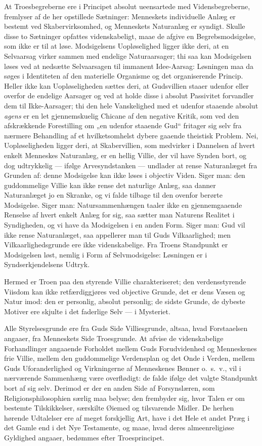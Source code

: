 \documentclass[12pt]{book}
\begin{document}
At Troesbegreberne ere i Principet absolut ueensartede med
Vidensbegreberne, fremlyser af de her opstillede Sætninger:
Menneskets individuelle Anlæg er bestemt ved Skabervirksomhed, og
Menneskets Naturanlæg er syndigt. Skulle disse to Sætninger opfattes
videnskabeligt, maae de afgive en Begrebsmodsigelse, som ikke er til
at løse. Modsigelsens Uopløselighed ligger ikke deri, at en
Selvaarsag virker sammen med endelige Naturaarsager; thi saa kan
Modsigelsen løses ved at nedsætte Selvaarsagen til immanent
Idee-Aarsag: Løsningen maa da søges i Identiteten af den materielle
Organisme og det organiserende Princip. Heller ikke kan
Uopløseligheden sættes deri, at Gudsvillien staaer udenfor eller
overfor de endelige Aarsager og ved at holde disse i absolut
Passivitet forvandler dem til Ikke-Aarsager; thi den hele
Vanskelighed med et udenfor staaende absolut \textit{agens} er en
let gjennemskuelig Chicane af den negative Kritik, som ved den
afskrækkende Forestilling om „en udenfor staaende Gud“ fritager sig
selv fra nærmere Behandling af et hvilketsomhelst dybere gaaende
theistisk Problem. Nei, Uopløseligheden ligger deri, at
Skabervillien, som medvirker i Dannelsen af hvert enkelt Menneskes
Naturanlæg, er en hellig Villie, der vil have Synden bort, og dog
udtrykkelig --- ifølge Arvesyndstanken --- undlader at rense
Naturanlæget fra Grunden af: denne Modsigelse kan ikke løses i
objectiv Viden. Siger man: den guddommelige Villie kan ikke rense
det naturlige Anlæg, saa danner Naturanlæget jo en Skranke, og vi
falde tilbage til den ovenfor berørte Modsigelse. Siger man:
Natursammenhængen taaler ikke en gjennemgaaende Renselse af hvert
enkelt Anlæg for sig, saa sætter man Naturens Realitet i
Syndigheden, og vi have da Modsigelsen i en anden Form. Siger man:
Gud vil ikke rense Naturanlæget, saa appellerer man til Guds
Vilkaarlighed; men Vilkaarlighedsgrunde ere ikke videnskabelige. Fra
Troens Standpunkt er Modsigelsen løst, nemlig i Form af
Selvmodsigelse: Løsningen er i Syndserkjendelsens Udtryk.

Hermed er Troen paa den styrende Villie charakteriseret; den
verdensstyrende Viisdom kan ikke retfærdiggjøres ved objective
Grunde, det er dens Væsen og Natur imod: den er personlig, absolut
personlig; de sidste Grunde, de dybeste Motiver ere skjulte i det
faderlige Selv --- i Mysteriet.

Alle Styrelsesgrunde ere fra Guds Side Villiesgrunde, altsaa, hvad
Forstaaelsen angaaer, fra Menneskets Side Troesgrunde. At afvise de
videnskabelige Forhandlinger angaaende Forholdet mellem Guds
Forudvidenhed og Menneskenes frie Villie, mellem den guddommelige
Verdensplan og det Onde i Verden, mellem Guds Uforanderlighed og
Virkningerne af Menneskenes Bønner o.\ s.\ v., vil i nærværende
Sammenhæng være overflødigt: de falde ifølge det valgte Standpunkt
bort af sig selv. Derimod er der en anden Side af Forsynslæren, som
Religionsphilosophien særlig maa belyse; den frembyder sig, hvor
Talen er om bestemte Tilskikkelser, særskilte Øiemed og tilsvarende
Midler. De herhen hørende Udtalelser ere af meget forskjellig Art,
have i det Hele et andet Præg i det Gamle end i det Nye Testamente,
og maae, hvad deres almeenreligiøse Gyldighed angaaer, bedømmes
efter Troesprincipet.
\end{document}
